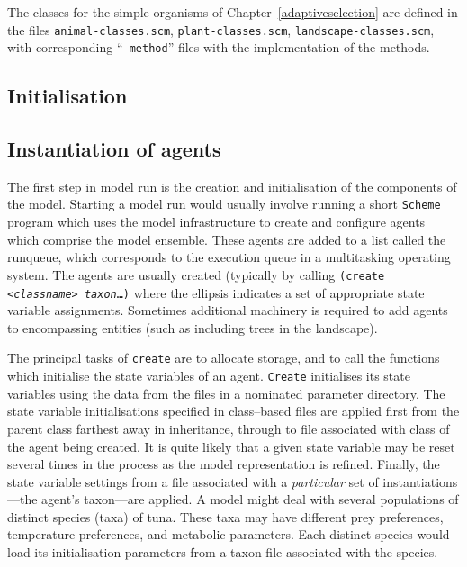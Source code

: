 The classes for the simple organisms of
Chapter~\ref{adaptiveselection} are defined in the files
\texttt{animal-classes.scm}, \texttt{plant-classes.scm},
\texttt{landscape-classes.scm}, with corresponding
``\texttt{-method}'' files with the implementation of the methods.


\subsection{Initialisation}

\subsection{Instantiation of agents}

The first step in model run is the creation and initialisation of the
components of the model. Starting a model run would usually involve
running a short \texttt{Scheme} program which uses the model
infrastructure to create and configure agents which comprise the model
ensemble.  These agents are added to a list called the runqueue, which
corresponds to the execution queue in a multitasking operating
system. The agents are usually created (typically by calling
\texttt{(create \textit{<classname> \textit{taxon}}\/\ldots)} where
the ellipsis indicates a set of appropriate state variable
assignments.  Sometimes additional machinery is required to add agents
to encompassing entities (such as including trees in the landscape).

The principal tasks of \texttt{create} are to allocate storage, and to
call the functions which initialise the state variables of an agent.
\texttt{Create} initialises its state variables using the data from
the files in a nominated parameter directory. The state variable
initialisations specified in class--based files are applied first from
the parent class farthest away in inheritance, through to file
associated with class of the agent being created. It is quite likely
that a given state variable may be reset several times in the process
as the model representation is refined. Finally, the state variable
settings from a file associated with a \emph{particular}\/ set of
instantiations---the agent's taxon---are applied.  A model might deal
with several populations of distinct species (taxa) of tuna.
These taxa may have different prey preferences, temperature preferences, and
metabolic parameters.  Each distinct species would load its
initialisation parameters from a taxon file associated with the
species.

